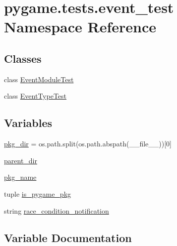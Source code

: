 \hypertarget{namespacepygame_1_1tests_1_1event__test}{}\section{pygame.\+tests.\+event\+\_\+test Namespace Reference}
\label{namespacepygame_1_1tests_1_1event__test}
\subsection*{Classes}
\begin{DoxyCompactItemize}
\item 
class \hyperlink{classpygame_1_1tests_1_1event__test_1_1_event_module_test}{Event\+Module\+Test}
\item 
class \hyperlink{classpygame_1_1tests_1_1event__test_1_1_event_type_test}{Event\+Type\+Test}
\end{DoxyCompactItemize}
\subsection*{Variables}
\begin{DoxyCompactItemize}
\item 
\hyperlink{namespacepygame_1_1tests_1_1event__test_aefa41d5dddc5b57bcbacd245bddfdfca}{pkg\+\_\+dir} = os.\+path.\+split(os.\+path.\+abspath(\+\_\+\+\_\+file\+\_\+\+\_\+))\mbox{[}0\mbox{]}
\item 
\hyperlink{namespacepygame_1_1tests_1_1event__test_aae355a604a58af35cc3ccc968182617d}{parent\+\_\+dir}
\item 
\hyperlink{namespacepygame_1_1tests_1_1event__test_a7530d6a4f7776c89a51d6dbe374929ba}{pkg\+\_\+name}
\item 
tuple \hyperlink{namespacepygame_1_1tests_1_1event__test_a39b074ad80ea3e2a04cd8c5305d45483}{is\+\_\+pygame\+\_\+pkg}
\item 
string \hyperlink{namespacepygame_1_1tests_1_1event__test_af80c2b5f40d90ad1bc3bf5f3a3ce7af9}{race\+\_\+condition\+\_\+notification}
\end{DoxyCompactItemize}


\subsection{Variable Documentation}
\mbox{\label{namespacepygame_1_1tests_1_1event__test_a39b074ad80ea3e2a04cd8c5305d45483}} 
